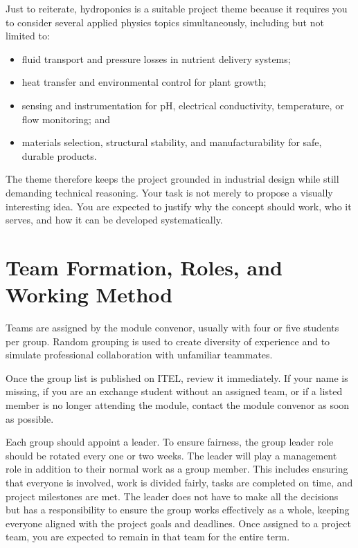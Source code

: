 Just to reiterate, hydroponics is a suitable project theme because it requires you to consider several applied physics topics simultaneously, including but not limited to:
\begin{itemize}
    \item fluid transport and pressure losses in nutrient delivery systems;
    \item heat transfer and environmental control for plant growth;
    \item sensing and instrumentation for pH, electrical conductivity, temperature, or flow monitoring; and
    \item materials selection, structural stability, and manufacturability for safe, durable products.
\end{itemize}

The theme therefore keeps the project grounded in industrial design while still demanding technical reasoning. Your task is not merely to propose a visually interesting idea. You are expected to justify why the concept should work, who it serves, and how it can be developed systematically.

\section{Team Formation, Roles, and Working Method}

Teams are assigned by the module convenor, usually with four or five students per group. Random grouping is used to create diversity of experience and to simulate professional collaboration with unfamiliar teammates.

Once the group list is published on ITEL, review it immediately. If your name is missing, if you are an exchange student without an assigned team, or if a listed member is no longer attending the module, contact the module convenor as soon as possible.

Each group should appoint a leader. To ensure fairness, the group leader role should be rotated every one or two weeks. The leader will play a management role in addition to their normal work as a group member. This includes ensuring that everyone is involved, work is divided fairly, tasks are completed on time, and project milestones are met. The leader does not have to make all the decisions but has a responsibility to ensure the group works effectively as a whole, keeping everyone aligned with the project goals and deadlines. Once assigned to a project team, you are expected to remain in that team for the entire term.

